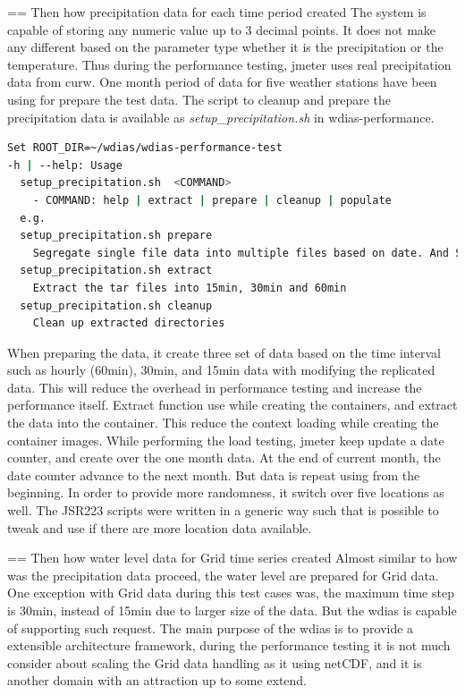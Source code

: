== Then how precipitation data for each time period created
The system is capable of storing any numeric value up to 3 decimal points. It does not make any different based on the parameter type whether it is the precipitation or the temperature. Thus during the performance testing, \acrshort{jmeter} uses real precipitation data from \acrshort{curw}. One month period of data for five weather stations have been using for prepare the test data. The script to cleanup and prepare the precipitation data is available as \emph{setup\_precipitation.sh} in wdias-performance.

\begin{lstlisting}[language=sh, caption=Precipitation Data Preparation]
Set ROOT_DIR=~/wdias/wdias-performance-test
-h | --help: Usage
  setup_precipitation.sh  <COMMAND>
    - COMMAND: help | extract | prepare | cleanup | populate
  e.g.
  setup_precipitation.sh prepare
    Segregate single file data into multiple files based on date. And Separate into main directories of 15min, 30min, 60min and create tar files
  setup_precipitation.sh extract
    Extract the tar files into 15min, 30min and 60min
  setup_precipitation.sh cleanup
    Clean up extracted directories
\end{lstlisting}
When preparing the data, it create three set of data based on the time interval such as hourly (60min), 30min, and 15min data with modifying the replicated data.
This will reduce the overhead in performance testing and increase the performance itself.
Extract function use while creating the containers, and extract the data into the container. This reduce the context loading while creating the container images.
While performing the load testing, \acrshort{jmeter} keep update a date counter, and create over the one month data. At the end of current month, the date counter advance to the next month. But data is repeat using from the beginning. In order to provide more randomness, it switch over five locations as well. The JSR223 scripts were written in a generic way such that is possible to tweak and use if there are more location data available.

== Then how water level data for Grid time series created
Almost similar to how was the precipitation data proceed, the water level are prepared for Grid data. One exception with Grid data during this test cases was, the maximum time step is 30min, instead of 15min due to larger size of the data. But the \acrshort{wdias} is capable of supporting such request. The main purpose of the \acrshort{wdias} is to provide a extensible architecture framework, during the performance testing it is not much consider about scaling the Grid data handling as it using \acrshort{netCDF}, and it is another domain with an attraction up to some extend.

